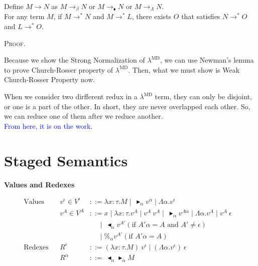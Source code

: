 \documentclass[9pt, a4paper]{extarticle}
\theoremstyle{break}
\newcommand{\figheader}[2]{
  \begin{flushleft}
    #2 {\bf \normalsize #1}
\end{flushleft}}
\newcommand{\TB}{\blacktriangleright}
\newcommand{\TBL}{\blacktriangleleft}
\newcommand{\blue}[1]{\textcolor{blue}{ #1 }}
\begin{document}
\begin{thm}
    Define $M \longrightarrow N$ as $M \longrightarrow_{\beta} N$ or $M\longrightarrow_\blacklozenge N$ or  $M \longrightarrow_{\Lambda} N$.\\
    For any term $M$, if $M \longrightarrow^* N$ and $M \longrightarrow^* L$,
    there exists $O$ that satisfies $N \longrightarrow^* O$ and $L \longrightarrow^* O$.
\end{thm}

\textsc{Proof.}

Because we show the Strong Normalization of $\lambda^{\text{MD}}$, we can use Newman's lemma to prove Church-Rosser property of $\lambda^{\text{MD}}$.
Then, what we must show is Weak Church-Rosser Property now.

When we consider two dirfferent redux in a $\lambda^{\text{MD}}$ term, they can only be disjoint, or one is a part of the other.
In short, they are never overlapped each other.
So, we can reduce one of them after we reduce another.\\

\blue{From here, it is on the work.}

\section{ Staged Semantics }

\figheader{Values and Redexes}{}

\begin{align*}
    \textrm{Values} && v^\epsilon \in V^\epsilon & ::= \lambda x:\tau.M \mid\ \TB_\alpha v^\alpha \mid \Lambda\alpha.v^\epsilon & \\
                    && v^A \in V^A & ::= x \mid \lambda x:\tau.v^A \mid v^A\ v^A \mid\ \TB_\alpha v^{A\alpha} 
                                           \mid \Lambda\alpha.v^A \mid v^A\ \epsilon &\\
                                    &&& \quad\   \mid\ \TBL_\alpha v^{A'} (\text{if } A'\alpha = A \text{ and } A' \neq \epsilon) & \\
                                    &&& \quad\   \mid \%_\alpha v^{A'} (\text{if } A'\alpha = A) & \\
    \textrm{Redexes} && R^\epsilon & ::= (\lambda x:\tau.M)\ v^\epsilon \mid (\Lambda\alpha.v^\epsilon)\ \epsilon & \\
                     && R^\alpha & ::=\ \TBL_\alpha \TB_\alpha M & \\
\end{align*}
\end{document}

